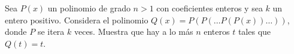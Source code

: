 Sea $P(x)$ un polinomio de grado $n>1$ con coeficientes enteros y sea $k$ un entero positivo. Considera el polinomio $Q(x) = P(P(\ldots P(P(x)) \ldots ))$, donde $P$ se itera $k$ veces. Muestra que hay a lo más $n$ enteros $t$ tales que $Q(t)=t$.